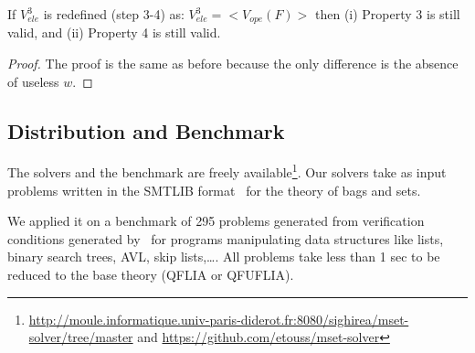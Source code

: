 \begin{myprop}
If $V^3_{ele}$ is redefined (step 3-4) as: $V^3_{ele} = <V_{ope}(F)>$ then
(i) Property 3 is still valid, and
(ii) Property 4 is  still valid.
\end{myprop}

\begin{proof}
The proof is the same as before because the only difference is the absence of useless $w$.
\end{proof}



\subsection{Distribution and Benchmark}
\label{ssec:bench}

The solvers and the benchmark are freely available\footnote{\url{http://moule.informatique.univ-paris-diderot.fr:8080/sighirea/mset-solver/tree/master} and \url{https://github.com/etouss/mset-solver}}. 
Our solvers take as input problems written in the SMTLIB format~\cite{SMTLIB10} for the theory of bags and sets.

We applied it on a benchmark of 295 problems generated from verification conditions generated by~\cite{EneaSW15}
for programs manipulating data structures
like lists, binary search trees, AVL, skip lists,\ldots.
All problems take less than 1 sec to be reduced to the base theory (QFLIA or QFUFLIA).
%

